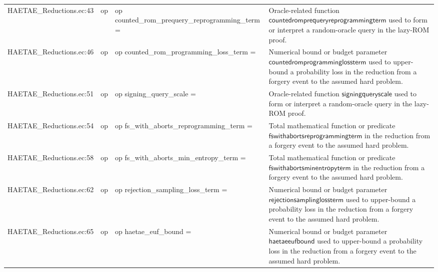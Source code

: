 \documentclass[10pt]{article}
\begin{document}
\begin{longtable}{L{0.11\textwidth}L{0.055\textwidth}L{0.385\textwidth}L{0.41\textwidth}}
HAETAE\_\allowbreak{}Reductions.\allowbreak{}ec:\allowbreak{}43 & op & {\ttfamily\scriptsize op counted\_\allowbreak{}rom\_\allowbreak{}prequery\_\allowbreak{}reprogramming\_\allowbreak{}term =} & Oracle-related function $\mathsf{countedromprequeryreprogrammingterm}$ used to form or interpret a random-oracle query in the lazy-ROM proof. \\
HAETAE\_\allowbreak{}Reductions.\allowbreak{}ec:\allowbreak{}46 & op & {\ttfamily\scriptsize op counted\_\allowbreak{}rom\_\allowbreak{}programming\_\allowbreak{}loss\_\allowbreak{}term =} & Numerical bound or budget parameter $\mathsf{countedromprogramminglossterm}$ used to upper-bound a probability loss in the reduction from a forgery event to the assumed hard problem. \\
HAETAE\_\allowbreak{}Reductions.\allowbreak{}ec:\allowbreak{}51 & op & {\ttfamily\scriptsize op signing\_\allowbreak{}query\_\allowbreak{}scale =} & Oracle-related function $\mathsf{signingqueryscale}$ used to form or interpret a random-oracle query in the lazy-ROM proof. \\
HAETAE\_\allowbreak{}Reductions.\allowbreak{}ec:\allowbreak{}54 & op & {\ttfamily\scriptsize op fs\_\allowbreak{}with\_\allowbreak{}aborts\_\allowbreak{}reprogramming\_\allowbreak{}term =} & Total mathematical function or predicate $\mathsf{fswithabortsreprogrammingterm}$ in the reduction from a forgery event to the assumed hard problem. \\
HAETAE\_\allowbreak{}Reductions.\allowbreak{}ec:\allowbreak{}58 & op & {\ttfamily\scriptsize op fs\_\allowbreak{}with\_\allowbreak{}aborts\_\allowbreak{}min\_\allowbreak{}entropy\_\allowbreak{}term =} & Total mathematical function or predicate $\mathsf{fswithabortsminentropyterm}$ in the reduction from a forgery event to the assumed hard problem. \\
HAETAE\_\allowbreak{}Reductions.\allowbreak{}ec:\allowbreak{}62 & op & {\ttfamily\scriptsize op rejection\_\allowbreak{}sampling\_\allowbreak{}loss\_\allowbreak{}term =} & Numerical bound or budget parameter $\mathsf{rejectionsamplinglossterm}$ used to upper-bound a probability loss in the reduction from a forgery event to the assumed hard problem. \\
HAETAE\_\allowbreak{}Reductions.\allowbreak{}ec:\allowbreak{}65 & op & {\ttfamily\scriptsize op haetae\_\allowbreak{}euf\_\allowbreak{}bound =} & Numerical bound or budget parameter $\mathsf{haetaeeufbound}$ used to upper-bound a probability loss in the reduction from a forgery event to the assumed hard problem. \\

\end{longtable}
\end{document}
